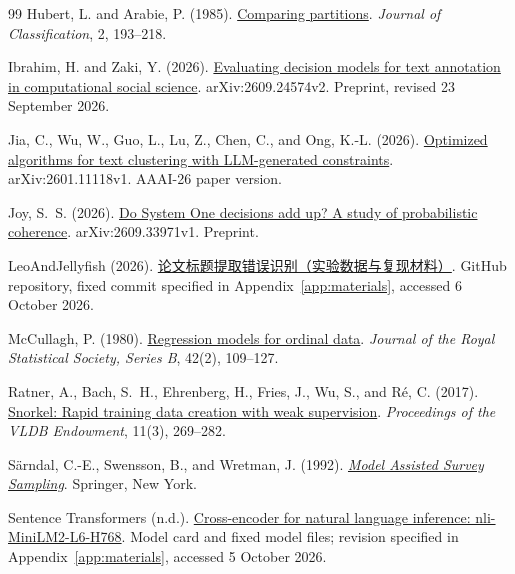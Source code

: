 \documentclass[UTF8,a4paper,zihao=-4,fontset=fandol]{ctexart}
\begin{document}
\begin{thebibliography}{99}
Hubert, L. and Arabie, P. (1985).
\href{https://doi.org/10.1007/BF01908075}{Comparing partitions}.
\emph{Journal of Classification}, 2, 193--218.

Ibrahim, H. and Zaki, Y. (2026).
\href{https://arxiv.org/abs/2609.24574v2}{Evaluating decision models for text annotation in computational social science}.
arXiv:2609.24574v2. Preprint, revised 23 September 2026.

Jia, C., Wu, W., Guo, L., Lu, Z., Chen, C., and Ong, K.-L. (2026).
\href{https://arxiv.org/abs/2601.11118v1}{Optimized algorithms for text clustering with LLM-generated constraints}.
arXiv:2601.11118v1. AAAI-26 paper version.

Joy, S.~S. (2026).
\href{https://arxiv.org/abs/2609.33971v1}{Do System One decisions add up? A study of probabilistic coherence}.
arXiv:2609.33971v1. Preprint.

LeoAndJellyfish (2026).
\href{https://github.com/LeoAndJellyfish/paper-title-error-classification/tree/1b0ce28d265454680b5b383bbb7ff0929dca688b}{论文标题提取错误识别（实验数据与复现材料）}.
GitHub repository, fixed commit specified in Appendix~\ref{app:materials}, accessed 6 October 2026.

McCullagh, P. (1980).
\href{https://doi.org/10.1111/j.2517-6161.1980.tb01109.x}{Regression models for ordinal data}.
\emph{Journal of the Royal Statistical Society, Series B}, 42(2), 109--127.

Ratner, A., Bach, S.~H., Ehrenberg, H., Fries, J., Wu, S., and R{\'e}, C. (2017).
\href{https://doi.org/10.14778/3157794.3157797}{Snorkel: Rapid training data creation with weak supervision}.
\emph{Proceedings of the VLDB Endowment}, 11(3), 269--282.

S{\"a}rndal, C.-E., Swensson, B., and Wretman, J. (1992).
\href{https://link.springer.com/book/9780387406206}{\emph{Model Assisted Survey Sampling}}.
Springer, New York.

Sentence Transformers (n.d.).
\href{https://huggingface.co/cross-encoder/nli-MiniLM2-L6-H768}{Cross-encoder for natural language inference: nli-MiniLM2-L6-H768}.
Model card and fixed model files; revision specified in Appendix~\ref{app:materials}, accessed 5 October 2026.


\end{thebibliography}
\end{document}
